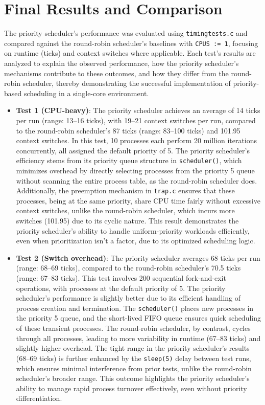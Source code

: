 \documentclass{article}
\begin{document}
\section{Final Results and Comparison}
The priority scheduler’s performance was evaluated using \texttt{timingtests.c} and compared against the round-robin scheduler’s baselines with \texttt{CPUS := 1}, focusing on runtime (ticks) and context switches where applicable. Each test’s results are analyzed to explain the observed performance, how the priority scheduler’s mechanisms contribute to these outcomes, and how they differ from the round-robin scheduler, thereby demonstrating the successful implementation of priority-based scheduling in a single-core environment.

\begin{itemize}
    \item \textbf{Test 1 (CPU-heavy)}: The priority scheduler achieves an average of 14 ticks per run (range: 13–16 ticks), with 19–21 context switches per run, compared to the round-robin scheduler’s 87 ticks (range: 83–100 ticks) and 101.95 context switches. In this test, 10 processes each perform 20 million iterations concurrently, all assigned the default priority of 5. The priority scheduler’s efficiency stems from its priority queue structure in \texttt{scheduler()}, which minimizes overhead by directly selecting processes from the priority 5 queue without scanning the entire process table, as the round-robin scheduler does. Additionally, the preemption mechanism in \texttt{trap.c} ensures that these processes, being at the same priority, share CPU time fairly without excessive context switches, unlike the round-robin scheduler, which incurs more switches (101.95) due to its cyclic nature. This result demonstrates the priority scheduler’s ability to handle uniform-priority workloads efficiently, even when prioritization isn’t a factor, due to its optimized scheduling logic.

    \item \textbf{Test 2 (Switch overhead)}: The priority scheduler averages 68 ticks per run (range: 68–69 ticks), compared to the round-robin scheduler’s 70.5 ticks (range: 67–83 ticks). This test involves 200 sequential fork-and-exit operations, with processes at the default priority of 5. The priority scheduler’s performance is slightly better due to its efficient handling of process creation and termination. The \texttt{scheduler()} places new processes in the priority 5 queue, and the short-lived FIFO queue ensures quick scheduling of these transient processes. The round-robin scheduler, by contrast, cycles through all processes, leading to more variability in runtime (67–83 ticks) and slightly higher overhead. The tight range in the priority scheduler’s results (68–69 ticks) is further enhanced by the \texttt{sleep(5)} delay between test runs, which ensures minimal interference from prior tests, unlike the round-robin scheduler’s broader range. This outcome highlights the priority scheduler’s ability to manage rapid process turnover effectively, even without priority differentiation.


\end{itemize}
\end{document}
